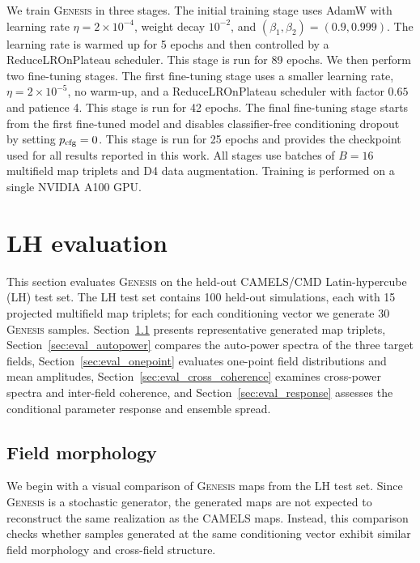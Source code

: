 \documentclass[usenatbib]{mnras}
\begin{document}
We train \textsc{Genesis} in three stages. The initial training stage
uses AdamW \citep{Loshchilov2019} with learning rate
$\eta=2\times10^{-4}$, weight decay $10^{-2}$, and
$(\beta_1,\beta_2)=(0.9,0.999)$. The learning rate is warmed up for
5 epochs and then controlled by a ReduceLROnPlateau scheduler. This
stage is run for 89 epochs. We then perform two fine-tuning stages. The first fine-tuning stage
uses a smaller learning rate, $\eta=2\times10^{-5}$, no warm-up, and
a ReduceLROnPlateau scheduler with factor $0.65$ and patience 4. This
stage is run for 42 epochs. The final fine-tuning stage starts from
the first fine-tuned model and disables classifier-free conditioning
dropout by setting $p_{\rm cfg}=0$. This stage is run for 25 epochs
and provides the checkpoint used for all results reported in this
work. All stages use batches of $B=16$ multifield map triplets and D4 data
augmentation. Training is performed on a single NVIDIA A100 GPU.

\section{LH evaluation}
\label{sec:eval}

This section evaluates \textsc{Genesis} on the held-out CAMELS/CMD
Latin-hypercube (LH) test set. The LH test set contains 100 held-out
simulations, each with 15 projected multifield map triplets; for each
conditioning vector we generate 30 \textsc{Genesis} samples.
Section~\ref{sec:eval_morphology} presents representative generated
map triplets, Section~\ref{sec:eval_autopower} compares the
auto-power spectra of the three target fields,
Section~\ref{sec:eval_onepoint} evaluates one-point field
distributions and mean amplitudes,
Section~\ref{sec:eval_cross_coherence} examines cross-power spectra
and inter-field coherence, and Section~\ref{sec:eval_response}
assesses the conditional parameter response and ensemble spread.

\subsection{Field morphology}
\label{sec:eval_morphology}

We begin with a visual comparison of \textsc{Genesis} maps from the
LH test set. Since \textsc{Genesis} is a stochastic generator, the
generated maps are not expected to reconstruct the same realization
as the CAMELS maps. Instead, this comparison checks whether samples
generated at the same conditioning vector exhibit similar field
morphology and cross-field structure.
\end{document}
